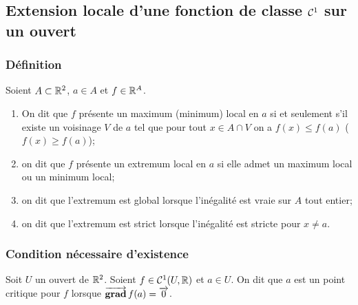 \subsection{Extension locale d'une fonction de classe \(\mathcal{C}^{1}\) sur 
un ouvert}

\subsubsection{Définition}

\begin{defdef}
  Soient \(A \subset \mathbb{R}^2\), \(a \in A\) et \(f \in \mathbb{R}^A\).
  \begin{enumerate}
    \item On dit que \(f\) présente un maximum (minimum) local en \(a\) 
      si et seulement s'il existe un voisinage \(V\) de \(a\) tel que 
      pour tout \(x \in A \cap V\) on a \(f(x) \leqslant f(a)\) (\(f(x) 
      \geqslant f(a)\));
    \item on dit que \(f\) présente un extremum local en \(a\) si elle 
      admet un maximum local ou un minimum local;
    \item on dit que l'extremum est global lorsque l'inégalité est vraie 
      sur \(A\) tout entier;
    \item on dit que l'extremum est strict lorsque l'inégalité est 
      stricte pour \(x \neq a\).
  \end{enumerate}
\end{defdef}

\subsubsection{Condition nécessaire d'existence}

\begin{defdef}
  Soit \(U\) un ouvert de \(\mathbb{R}^2\). Soient \(f \in \mathcal{C}^{1}(U, \mathbb{R})\) 
  et \(a \in U\). On dit que \(a\) est un point critique pour \(f\) 
  lorsque \(\operatorname{\overrightarrow{\mathbf{grad}}} f(a)=\overrightarrow{0}\).
\end{defdef}

